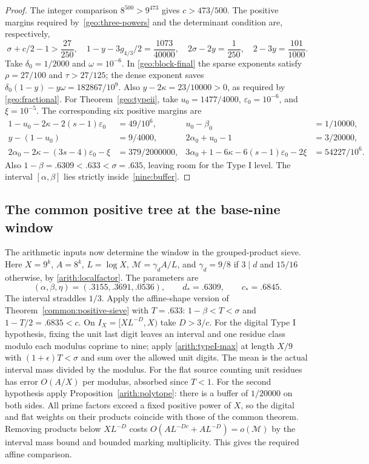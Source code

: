 \documentclass[11pt,a4paper]{article}
\theoremstyle{paperplain}
\numberwithin{equation}{section}
\begin{document}
\begin{proof}
The integer comparison $8^{500}>9^{473}$ gives $c>473/500$.
The positive margins required by~\eqref{geo:three-powers} and the determinant
condition are, respectively,
\[
 \sigma+c/2-1>\frac{27}{250},\quad
 1-y-3g_{4/3}/2=\frac{1073}{40000},\quad
 2\sigma-2y=\frac1{250},\quad 2-3y=\frac{101}{1000}.
\]
Take $\delta_0=1/2000$ and $\omega=10^{-6}$. In \eqref{geo:block-final}
the sparse exponents satisfy $\rho=27/100$ and $\tau>27/125$;
the dense exponent saves $\delta_0(1-y)-y\omega=182867/10^9$.
Also $y-2\kappa=23/10000>0$, as required by \eqref{geo:fractional}.
For Theorem~\ref{geo:typeii}, take
$u_0=1477/4000$, $\varepsilon_0=10^{-6}$, and $\xi=10^{-5}$.
The corresponding six positive margins are
\begin{align*}
 1-u_0-2\kappa-2(s-1)\varepsilon_0&=49/10^6,&
 u_0-\beta_0&=1/10000,\\
 y-(1-u_0)&=9/4000,&
 2\alpha_0+u_0-1&=3/20000,\\
 2\alpha_0-2\kappa-(3s-4)\varepsilon_0-\xi&=379/2000000,&
 3\alpha_0+1-6\kappa-6(s-1)\varepsilon_0-2\xi&=54227/10^6.
\end{align*}
Also $1-\beta=.6309<.633<\sigma=.635$, leaving room for the Type I level.
The interval $[\alpha,\beta]$ lies strictly inside~\eqref{nine:buffer}.
\end{proof}

\subsection{The common positive tree at the base-nine window}
\label{nine:common-tree}

The arithmetic inputs now determine the window in the grouped-product sieve. Here $X=9^k$, $A=8^k$, $L=\log X$,
$\mathcal M=\gamma_d A/L$, and $\gamma_d=9/8$ if $3\mid d$ and $15/16$
otherwise, by \eqref{arith:localfactor}. The parameters are
\[
 (\alpha,\beta,\eta)=(.3155,.3691,.0536),\qquad
 d_*=.6309,\qquad c_*=.6845.
\]
The interval straddles $1/3$. Apply the affine-shape version of
Theorem~\ref{common:positive-sieve} with $T=.633$:
$1-\beta<T<\sigma$ and $1-T/2=.6835<c$. On $I_X=[XL^{-D},X)$ take
$D>3/c$. For the digital Type I hypothesis, fixing the unit last digit
leaves an interval and one residue class modulo each modulus coprime
to nine; apply \eqref{arith:typeI-max} at length $X/9$ with
$(1+\epsilon)T<\sigma$ and sum over the allowed unit digits. The mean
is the actual interval mass divided by the modulus. For the flat source
counting unit residues has error $O(A/X)$ per modulus, absorbed since
$T<1$. For the second hypothesis apply Proposition~\ref{arith:polytope}:
there is a buffer of $1/20000$ on both sides. All prime factors exceed
a fixed positive power of $X$, so the digital and flat weights on their
products coincide with those of the common theorem. Removing products
below $XL^{-D}$ costs $O(A L^{-Dc}+A L^{-D})=o(\mathcal M)$ by the
interval mass bound and bounded marking multiplicity. This gives the
required affine comparison.
\end{document}
